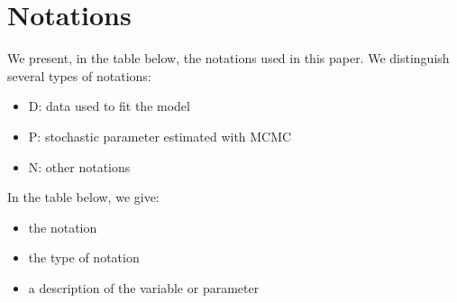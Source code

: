 \documentclass[a4paper]{article}
\newenvironment{Default Paragraph Font}{}{}
\begin{document}
\section{Notations}
\label{sec:notations-1}

We present, in the table below, the notations used in this paper. We
distinguish several types of notations:\\

\begin{itemize}
\item D: data used to fit the model
\item P: stochastic parameter estimated with MCMC
\item N: other notations\\
\end{itemize}

In the table below, we give:\\

\begin{itemize}
\item the notation
\item the type of notation
\item a description of the variable or parameter\\
\end{itemize}
\end{document}
